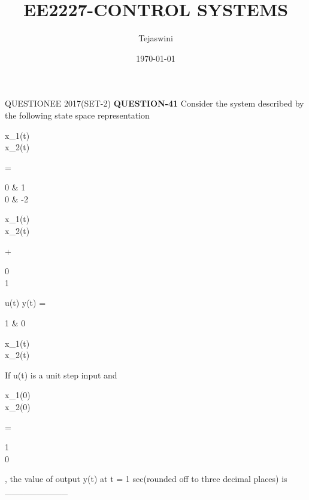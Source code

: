 \documentclass[15pt]{beamer}
\title{\hspace{2pt} EE2227-CONTROL SYSTEMS}
\author{Tejaswini}
\institute{EE18BTECH11047}
\date{\today}
\begin{document}
\titlepage


\begin{frame}{QUESTION}{EE 2017(SET-2)}
	\justifying  \textbf{QUESTION-41} \newline Consider the system described by the following state space representation 
	\newline \newline \begin{bmatrix}\dot x_{1}(t)\\\dot x_{2}(t)
	\end{bmatrix} = \begin{bmatrix}0 & 1 \\ 0 & -2\end{bmatrix}\begin{bmatrix}x_{1}(t)\\x_{2}(t)\end{bmatrix} + \begin{bmatrix}0 \\ 1\end{bmatrix}u(t) \newline \newline \newline
	y(t) = \begin{bmatrix}1 & 0\end{bmatrix}\begin{bmatrix}x_{1}(t)\\x_{2}(t)\end{bmatrix}
	\newline \newline If u(t) is a unit step input and \begin{bmatrix}x_{1}(0) \\ x_{2}(0)\end{bmatrix} = \begin{bmatrix}1 \\ 0 \end{bmatrix} , the value of output y(t) at t = 1 sec(rounded off to three decimal places) is __________
\end{frame}
\end{document}
